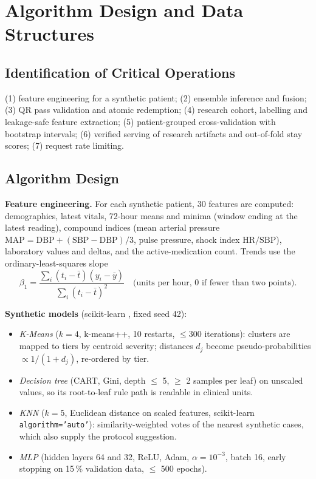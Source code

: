 \chapter{Algorithm Design and Data Structures}
\label{ch:algo}

\section{Identification of Critical Operations}
(1) feature engineering for a synthetic patient; (2) ensemble inference and fusion; (3) QR pass
validation and atomic redemption; (4) research cohort, labelling and leakage-safe feature extraction;
(5) patient-grouped cross-validation with bootstrap intervals; (6) verified serving of research artifacts
and out-of-fold stay scores; (7) request rate limiting.

\section{Algorithm Design}
\textbf{Feature engineering.} For each synthetic patient, 30 features are computed: demographics, latest
vitals, 72-hour means and minima (window ending at the latest reading), compound indices (mean arterial
pressure $\mathrm{MAP}=\mathrm{DBP}+(\mathrm{SBP}-\mathrm{DBP})/3$, pulse pressure, shock index
$\mathrm{HR}/\mathrm{SBP}$), laboratory values and deltas, and the active-medication count. Trends use the
ordinary-least-squares slope
\begin{equation}
\beta_1=\frac{\sum_i (t_i-\bar t)(y_i-\bar y)}{\sum_i (t_i-\bar t)^2}\quad\text{(units per hour, 0 if fewer than two points).}
\end{equation}

\textbf{Synthetic models} (scikit-learn \cite{pedregosa2011scikit}, fixed seed 42):
\begin{itemize}
\item \emph{K-Means} ($k=4$, k-means++, 10 restarts, $\le$300 iterations): clusters are mapped to tiers by
      centroid severity; distances $d_j$ become pseudo-probabilities $\propto 1/(1+d_j)$, re-ordered by tier.
\item \emph{Decision tree} (CART, Gini, depth $\le$ 5, $\ge$ 2 samples per leaf) on unscaled values, so its
      root-to-leaf rule path is readable in clinical units.
\item \emph{KNN} ($k=5$, Euclidean distance on scaled features, scikit-learn \texttt{algorithm='auto'}):
      similarity-weighted votes of the nearest synthetic cases, which also supply the protocol suggestion.
\item \emph{MLP} (hidden layers 64 and 32, ReLU, Adam, $\alpha=10^{-3}$, batch 16, early stopping on 15\,\%
      validation data, $\le$ 500 epochs).
\end{itemize}

